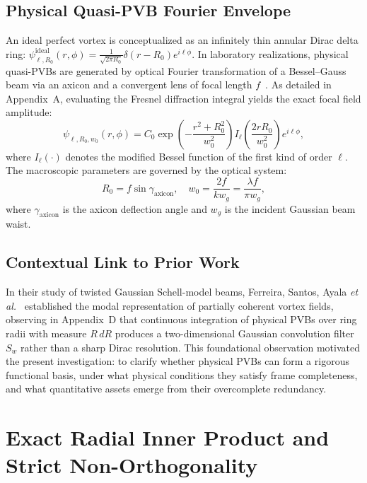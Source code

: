 \documentclass[11pt,a4paper]{article}
\begin{document}
\subsection{Physical Quasi-PVB Fourier Envelope}

An ideal perfect vortex is conceptualized as an infinitely thin annular Dirac delta ring: $\psi_{\ell, R_0}^{\text{ideal}}(r, \phi) = \frac{1}{\sqrt{2\pi R_0}} \delta(r - R_0) e^{i \ell \phi}$. In laboratory realizations, physical quasi-PVBs are generated by optical Fourier transformation of a Bessel--Gauss beam via an axicon and a convergent lens of focal length $f$~\cite{Vaity2015}. As detailed in Appendix~A, evaluating the Fresnel diffraction integral yields the exact focal field amplitude:
\begin{equation}
\psi_{\ell, R_0, w_0}(r, \phi) = C_0 \exp\left(-\frac{r^2 + R_0^2}{w_0^2}\right) I_\ell\left(\frac{2 r R_0}{w_0^2}\right) e^{i \ell \phi},
\label{eq:pvb_field}
\end{equation}
where $I_\ell(\cdot)$ denotes the modified Bessel function of the first kind of order $\ell$. The macroscopic parameters are governed by the optical system:
\begin{equation}
R_0 = f \sin \gamma_{\text{axicon}}, \quad w_0 = \frac{2 f}{k w_g} = \frac{\lambda f}{\pi w_g},
\end{equation}
where $\gamma_{\text{axicon}}$ is the axicon deflection angle and $w_g$ is the incident Gaussian beam waist.

\subsection{Contextual Link to Prior Work}

In their study of twisted Gaussian Schell-model beams, Ferreira, Santos, Ayala \emph{et al.}~\cite{Ferreira2026} established the modal representation of partially coherent vortex fields, observing in Appendix~D that continuous integration of physical PVBs over ring radii with measure $R \, dR$ produces a two-dimensional Gaussian convolution filter $S_w$ rather than a sharp Dirac resolution. This foundational observation motivated the present investigation: to clarify whether physical PVBs can form a rigorous functional basis, under what physical conditions they satisfy frame completeness, and what quantitative assets emerge from their overcomplete redundancy.

\section{Exact Radial Inner Product and Strict Non-Orthogonality}
\label{sec:inner_product}
\end{document}
